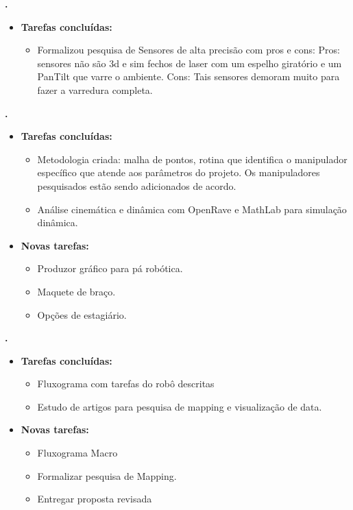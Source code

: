 			
   \textbf{\gabriel.} 
	\begin{itemize}
		\item \textbf{Tarefas concluídas:}
			\begin{itemize}    
				\item Formalizou pesquisa de Sensores de alta precisão com pros e cons:
				Pros: sensores não são 3d e sim fechos de laser com um espelho giratório e
				um PanTilt que varre o ambiente.
				Cons: Tais sensores demoram muito para fazer a varredura completa.
			\end{itemize}
		
	\end{itemize}

			
\textbf{.} 
	\begin{itemize}
		\item \textbf{Tarefas concluídas:}
			\begin{itemize}    
				\item Metodologia criada: malha de pontos, rotina que identifica o
				manipulador específico que atende aos parâmetros do projeto. Os
				manipuladores pesquisados estão sendo adicionados de acordo.
				\item Análise cinemática e dinâmica com OpenRave e MathLab para simulação
				dinâmica.
			\end{itemize}
		
		\item \textbf{Novas tarefas:}
			\begin{itemize} 
				\item Produzor gráfico para pá robótica.
				\item Maquete de braço.
				\item Opções de estagiário.
			\end{itemize}
	\end{itemize}
	
		
   \textbf{\julia.} 
	\begin{itemize}
		\item \textbf{Tarefas concluídas:}
			\begin{itemize}    
				\item Fluxograma com tarefas do robô descritas
			    \item Estudo de artigos para pesquisa de mapping e visualização de data.
			\end{itemize}
		
		\item \textbf{Novas tarefas:}
			\begin{itemize} 
			 \item Fluxograma Macro
			 \item Formalizar pesquisa de Mapping.
			 \item Entregar proposta revisada
			\end{itemize}
	\end{itemize}

